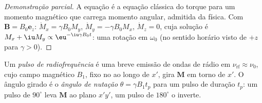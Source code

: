 \begin{proof}[Demonstração parcial]
A equação é a equação clássica do torque para um momento magnético que
carrega momento angular, admitida da física. Com $\mathbf B = B_0\mathbf e_z$: $\dot M_x = \gamma
B_0M_y$, $\dot M_y = -\gamma B_0M_x$, $\dot M_z = 0$, cuja solução é $M_x + \iu M_y \propto
\eu^{-\iu\gamma B_0t}$: uma rotação em $\omega_0$ (no sentido horário visto de $+z$ para $\gamma > 0$).
\end{proof}

\begin{definition}\label{def:b3:advanced-nmr:pulse}
Um \emph{pulso de radiofrequência} é uma breve emissão de
ondas de rádio em $\nu_{\mathrm{rf}} \approx \nu_0$, cujo campo magnético $B_1$, fixo no
 ao longo de $x'$, gira $\mathbf M$ em torno de $x'$. O ângulo girado é o
\emph{ângulo de nutação} $\theta = \gamma B_1t_p$ para um pulso de duração
$t_p$: um pulso de $90^\circ$ leva $\mathbf M$ ao plano $x'y'$, um pulso de $180^\circ$ o
inverte.
\end{definition}

